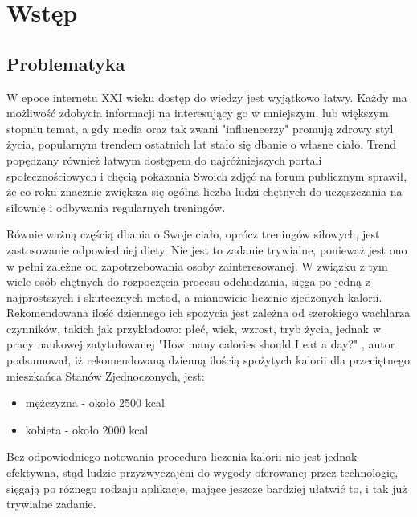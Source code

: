 \documentclass[12pt, a4paper]{article}
\begin{document}
\begin{sloppypar}

\renewcommand\listfigurename{\section{Indeks rysunków}}
\newcommand*{\captionsource}[2]{%
  \caption[{#1}]{%
    #1%
    \\\hspace{\linewidth}%
    Źródło: #2%
  }%
}

\tableofcontents
\newpage

\section{Wstęp}
{
  \subsection{Problematyka}
  {
    W epoce internetu XXI wieku dostęp do wiedzy jest wyjątkowo łatwy. Każdy ma możliwość
    zdobycia informacji na interesujący go w mniejszym, lub większym stopniu temat,
    a gdy media oraz tak zwani "influencerzy" promują zdrowy
    styl życia, popularnym trendem ostatnich lat stało się dbanie o własne ciało. 
    Trend popędzany również łatwym dostępem do najróżniejszych portali
    społecznościowych i chęcią pokazania Swoich zdjęć na forum publicznym sprawił, 
    że co roku znacznie zwiększa się ogólna liczba ludzi chętnych do uczęszczania na
    siłownię i odbywania regularnych treningów.

    Równie ważną częścią dbania o Swoje ciało, oprócz treningów siłowych, jest 
    zastosowanie odpowiedniej diety. Nie jest to zadanie trywialne, ponieważ jest 
    ono w pełni zależne od zapotrzebowania osoby zainteresowanej. W związku z tym
    wiele osób chętnych do rozpoczęcia procesu odchudzania, sięga po jedną z
    najprostszych i skutecznych metod, a mianowicie liczenie zjedzonych kalorii.
    Rekomendowana ilość dziennego ich spożycia jest zależna od szerokiego wachlarza
    czynników, takich jak przykładowo: płeć, wiek, wzrost, tryb życia, 
    jednak w pracy naukowej zatytułowanej "How many calories should I eat a day?"
    \cite{cal}, autor podsumował, iż rekomendowaną dzienną ilością spożytych kalorii 
    dla przeciętnego mieszkańca Stanów Zjednoczonych, jest:
    \begin{itemize}
      \item mężczyzna - około 2500 kcal
      \item kobieta - około 2000 kcal
    \end{itemize}
    Bez odpowiedniego notowania procedura liczenia kalorii nie jest jednak efektywna, 
    stąd ludzie przyzwyczajeni do wygody oferowanej przez technologię, sięgają po 
    różnego rodzaju aplikacje, mające jeszcze bardziej ułatwić to, i tak już trywialne
    zadanie.

}}
\end{sloppypar}
\end{document}
